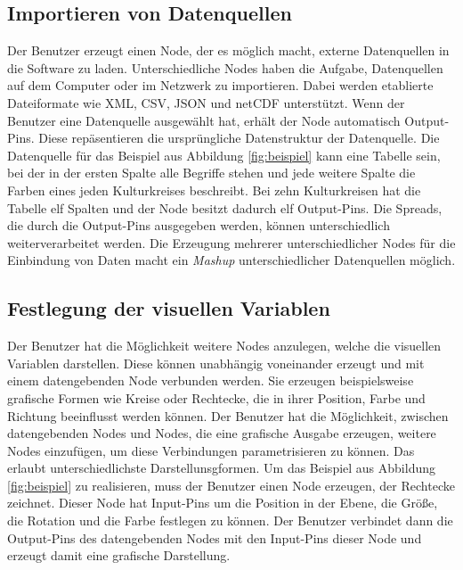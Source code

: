 \documentclass[a4paper, 
               12pt,
               DIV=calc,
               version=first,
               pdftex,
               headsepline,
               footsepline,
               bibliography=totocnumbered,
               listof=numbered]{scrreprt}
\begin{document}
\subsection{Importieren von Datenquellen}
Der Benutzer erzeugt einen Node, der es möglich macht, externe Datenquellen
in die Software zu laden. Unterschiedliche Nodes haben die Aufgabe, Datenquellen auf
dem Computer oder im Netzwerk zu importieren. Dabei werden etablierte
Dateiformate wie XML, CSV, JSON und netCDF unterstützt. Wenn der Benutzer eine 
Datenquelle ausgewählt hat, erhält der Node automatisch Output-Pins.
Diese repäsentieren die ursprüngliche Datenstruktur der Datenquelle.
Die Datenquelle für das Beispiel aus Abbildung \ref{fig:beispiel} kann eine Tabelle sein,
bei der in der ersten Spalte alle Begriffe stehen und jede weitere Spalte die Farben
eines jeden Kulturkreises beschreibt. Bei zehn Kulturkreisen hat die Tabelle
elf Spalten und der Node besitzt dadurch elf Output-Pins. Die Spreads, die durch
die Output-Pins ausgegeben werden, können unterschiedlich
weiterverarbeitet werden.
Die Erzeugung mehrerer unterschiedlicher Nodes für die Einbindung von Daten macht ein
\textit{Mashup} unterschiedlicher Datenquellen möglich.
\subsection{Festlegung der visuellen Variablen}
Der Benutzer hat die Möglichkeit weitere Nodes anzulegen, welche die visuellen
Variablen darstellen. Diese können unabhängig voneinander erzeugt und mit einem datengebenden
Node verbunden werden. Sie erzeugen beispielsweise grafische Formen wie Kreise oder Rechtecke,
die in ihrer Position, Farbe und Richtung beeinflusst werden können.
Der Benutzer hat die Möglichkeit, zwischen datengebenden Nodes und
Nodes, die eine grafische Ausgabe erzeugen, weitere Nodes einzufügen, um diese Verbindungen
parametrisieren zu können. Das erlaubt unterschiedlichste Darstellunsgformen.
Um das Beispiel aus Abbildung \ref{fig:beispiel} zu realisieren, muss der Benutzer einen
Node erzeugen, der Rechtecke zeichnet. Dieser Node hat Input-Pins um die Position
in der Ebene, die Größe, die Rotation und die Farbe festlegen zu können. Der Benutzer
verbindet dann die Output-Pins des datengebenden Nodes mit den Input-Pins dieser Node
und erzeugt damit eine grafische Darstellung.
\end{document}
